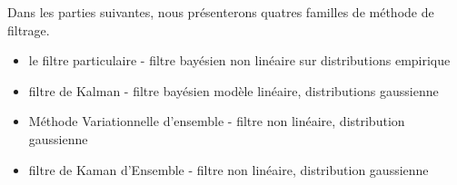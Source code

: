 Dans les parties suivantes, nous présenterons quatres familles de méthode de filtrage.

\begin{itemize}
    \item le filtre particulaire - filtre bayésien non linéaire sur distributions empirique
    \item filtre de Kalman - filtre bayésien modèle linéaire, distributions gaussienne
    \item Méthode Variationnelle d'ensemble - filtre non linéaire, distribution gaussienne
    \item filtre de Kaman d'Ensemble - filtre non linéaire, distribution gaussienne

\end{itemize}

